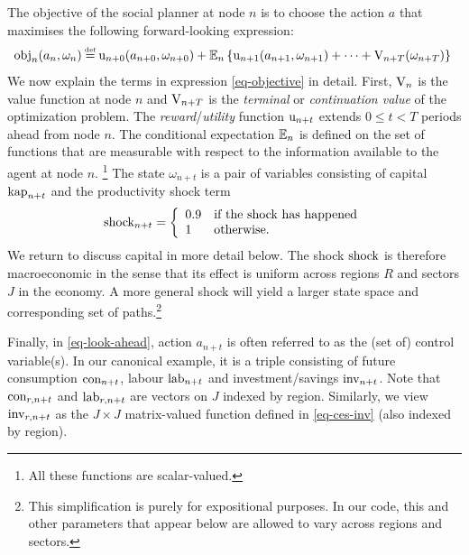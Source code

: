 \documentclass[12pt,a4paper,twoside, draft]{article}
\begin{document}
The objective of the social planner at node $n$ is to choose the action $a$
that maximises the following forward-looking expression:
\begin{align}\label{eq-objective}
\hskip-3pt   \textup{obj}_{n}(a_{n}, \omega_{n}) \defeq
   \textup{u}_{n + 0}(a_{n + 0}, \omega_{n + 0})
    + \mbb{E}_{n}\left\{
      \textup{u}_{n + 1}(a_{n + 1}, \omega_{n + 1}) + \cdots
      + \textup{V}_{n + T}(\omega_{n + T})
    \right\}
\end{align}
We now explain the terms in expression \eqref{eq-objective} in detail.
First, $\textup{V}_{n}$ is the value function at node $n$ and
$\textup{V}_{n + T}$ is the \emph{terminal} or \emph{continuation value} of the
optimization problem.
The \emph{reward}/\emph{utility} function $\textup{u}_{n + t}$ extends
$0 \leq t < T$ periods ahead from node $n$.
The conditional expectation $\mathbb{E}_{n}$ is defined on the set of functions
that are measurable with respect to the information available to the agent at 
node $n$.
\footnote{
   All these functions are scalar-valued.
}
The state $\omega_{n + t} $ is a pair of variables consisting  of capital
$\textup{kap}_{n + t}$ and the productivity shock term
\begin{equation}
   \textup{shock}_{n + t} = \left\{
      \begin{array}{ll}
         0.9 & \textup{if the shock has happened}\\
         1 & \textup{otherwise.}
      \end{array}\right.
\end{equation}
We return to discuss capital in more detail below.
The shock $\textup{shock}$ is therefore macroeconomic in the sense that
its effect is uniform across regions $R$ and sectors $J$ in the economy.
A more general shock will yield a larger state space and corresponding set of
paths.\footnote{
   This simplification is purely for expositional purposes.
   In our code, this and other parameters that appear below are allowed to vary 
   across regions and sectors.
}

Finally, in \eqref{eq-look-ahead}, action $a_{n + t}$ is often referred to as
the (set of) control variable(s).
In our canonical example, it is a triple consisting of future consumption
$\textup{con}_{n + t}$, labour $\textup{lab}_{n + t}$ and investment/savings
$\textup{inv}_{n + t}$.
Note that $\textup{con}_{r, n + t}$ and $\textup{lab}_{r, n + t}$ are vectors
on $J$ indexed by region.
Similarly, we view $\textup{inv}_{r, n + t}$ as the $J\times J$ matrix-valued
function defined in \eqref{eq-ces-inv} (also indexed by region).
\end{document}
